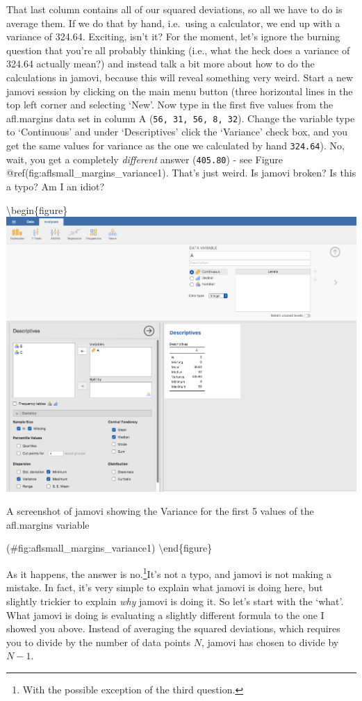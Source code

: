 \documentclass[
]{book}
\begin{document}
That last column contains all of our squared deviations, so all we have to do is average them. If we do that by hand, i.e.~using a calculator, we end up with a variance of 324.64. Exciting, isn't it? For the moment, let's ignore the burning question that you're all probably thinking (i.e., what the heck does a variance of 324.64 actually mean?) and instead talk a bit more about how to do the calculations in jamovi, because this will reveal something very weird. Start a new jamovi session by clicking on the main menu button (three horizontal lines in the top left corner and selecting `New'. Now type in the first five values from the afl.margins data set in column A (\texttt{56,\ 31,\ 56,\ 8,\ 32}). Change the variable type to `Continuous' and under `Descriptives' click the `Variance' check box, and you get the same values for variance as the one we calculated by hand \texttt{324.64}). No, wait, you get a completely \emph{different} answer (\texttt{405.80}) - see Figure @ref(fig:aflsmall\_margins\_variance1). That's just weird. Is jamovi broken? Is this a typo? Am I an idiot?

\textbackslash begin\{figure\}
\includegraphics[width=18.9in]{img/descriptives/aflsmall_margins_variance1}

\caption{A screenshot of jamovi showing the Variance for the first 5 values of the afl.margins variable }

(\#fig:aflsmall\_margins\_variance1)
\textbackslash end\{figure\}

As it happens, the answer is no.\footnote{With the possible exception of the third question.}It's not a typo, and jamovi is not making a mistake. In fact, it's very simple to explain what jamovi is doing here, but slightly trickier to explain \emph{why} jamovi is doing it. So let's start with the `what'. What jamovi is doing is evaluating a slightly different formula to the one I showed you above. Instead of averaging the squared deviations, which requires you to divide by the number of data points \(N\), jamovi has chosen to divide by \(N-1\).
\end{document}
